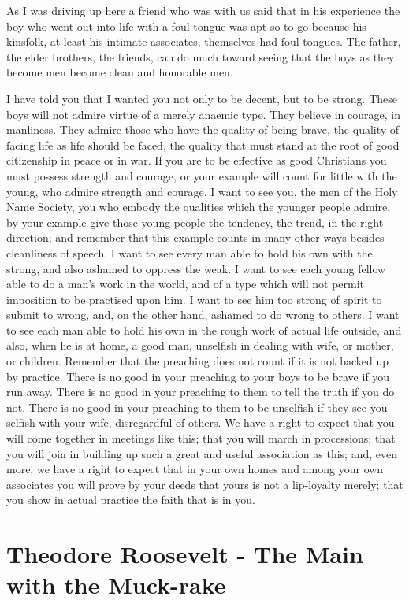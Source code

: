 \documentclass[a4paper]{amsbook}
\begin{document}
As I was driving up here a friend who was with us said that in his experience the boy who went out into life with a foul tongue was apt so to go because his kinsfolk, at least his intimate associates, themselves had foul tongues. The father, the elder brothers, the friends, can do much toward seeing that the boys as they become men become clean and honorable men.

I have told you that I wanted you not only to be decent, but to be strong. These boys will not admire virtue of a merely anaemic type. They believe in courage, in manliness. They admire those who have the quality of being brave, the quality of facing life as life should be faced, the quality that must stand at the root of good citizenship in peace or in war. If you are to be effective as good Christians you must possess strength and courage, or your example will count for little with the young, who admire strength and courage. I want to see you, the men of the Holy Name Society, you who embody the qualities which the younger people admire, by your example give those young people the tendency, the trend, in the right direction; and remember that this example counts in many other ways besides cleanliness of speech. I want to see every man able to hold his own with the strong, and also ashamed to oppress the weak. I want to see each young fellow able to do a man's work in the world, and of a type which will not permit imposition to be practised upon him. I want to see him too strong of spirit to submit to wrong, and, on the other hand, ashamed to do wrong to others. I want to see each man able to hold his own in the rough work of actual life outside, and also, when he is at home, a good man, unselfish in dealing with wife, or mother, or children. Remember that the preaching does not count if it is not backed up by practice. There is no good in your preaching to your boys to be brave if you run away. There is no good in your preaching to them to tell the truth if you do not. There is no good in your preaching to them to be unselfish if they see you selfish with your wife, disregardful of others. We have a right to expect that you will come together in meetings like this; that you will march in processions; that you will join in building up such a great and useful association as this; and, even more, we have a right to expect that in your own homes and among your own associates you will prove by your deeds that yours is not a lip-loyalty merely; that you show in actual practice the faith that is in you.


\chapter{Theodore Roosevelt - The Main with the Muck-rake}
\end{document}
